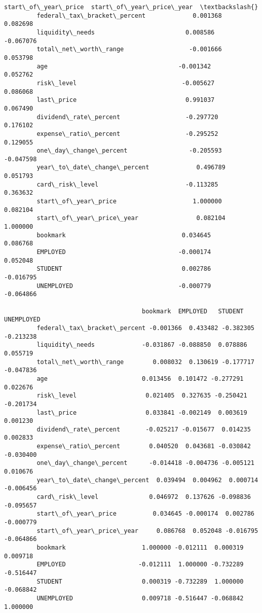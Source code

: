 \documentclass[11pt]{article}
\begin{document}
\begin{Verbatim}[commandchars=\\\{\}]
                                      start\_of\_year\_price  start\_of\_year\_price\_year  \textbackslash{}
         federal\_tax\_bracket\_percent             0.001368                  0.082698   
         liquidity\_needs                         0.008586                 -0.067076   
         total\_net\_worth\_range                  -0.001666                  0.053798   
         age                                    -0.001342                  0.052762   
         risk\_level                             -0.005627                  0.086068   
         last\_price                              0.991037                  0.067490   
         dividend\_rate\_percent                  -0.297720                  0.176102   
         expense\_ratio\_percent                  -0.295252                  0.129055   
         one\_day\_change\_percent                 -0.205593                 -0.047598   
         year\_to\_date\_change\_percent             0.496789                  0.051793   
         card\_risk\_level                        -0.113285                  0.363632   
         start\_of\_year\_price                     1.000000                  0.082104   
         start\_of\_year\_price\_year                0.082104                  1.000000   
         bookmark                                0.034645                  0.086768   
         EMPLOYED                               -0.000174                  0.052048   
         STUDENT                                 0.002786                 -0.016795   
         UNEMPLOYED                             -0.000779                 -0.064866   
         
                                      bookmark  EMPLOYED   STUDENT  UNEMPLOYED  
         federal\_tax\_bracket\_percent -0.001366  0.433482 -0.382305   -0.213238  
         liquidity\_needs             -0.031867 -0.088850  0.078886    0.055719  
         total\_net\_worth\_range        0.008032  0.130619 -0.177717   -0.047836  
         age                          0.013456  0.101472 -0.277291    0.022676  
         risk\_level                   0.021405  0.327635 -0.250421   -0.201734  
         last\_price                   0.033841 -0.002149  0.003619    0.001230  
         dividend\_rate\_percent       -0.025217 -0.015677  0.014235    0.002833  
         expense\_ratio\_percent        0.040520  0.043681 -0.030842   -0.030400  
         one\_day\_change\_percent      -0.014418 -0.004736 -0.005121    0.010676  
         year\_to\_date\_change\_percent  0.039494  0.004962  0.000714   -0.006456  
         card\_risk\_level              0.046972  0.137626 -0.098836   -0.095657  
         start\_of\_year\_price          0.034645 -0.000174  0.002786   -0.000779  
         start\_of\_year\_price\_year     0.086768  0.052048 -0.016795   -0.064866  
         bookmark                     1.000000 -0.012111  0.000319    0.009718  
         EMPLOYED                    -0.012111  1.000000 -0.732289   -0.516447  
         STUDENT                      0.000319 -0.732289  1.000000   -0.068842  
         UNEMPLOYED                   0.009718 -0.516447 -0.068842    1.000000  
\end{Verbatim}
            
\end{document}
